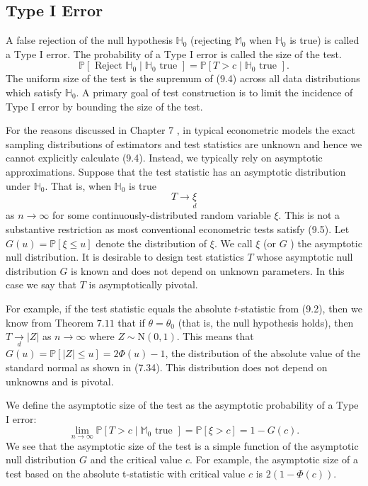 \documentclass[10pt]{article}
\begin{document}
\subsection{Type I Error}
A false rejection of the null hypothesis $\mathbb{H}_{0}$ (rejecting $\mathbb{M}_{0}$ when $\mathbb{H}_{0}$ is true) is called a Type I error. The probability of a Type I error is called the size of the test.
$$
\mathbb{P}\left[\text { Reject } \mathbb{H}_{0} \mid \mathbb{H}_{0} \text { true }\right]=\mathbb{P}\left[T>c \mid \mathbb{H}_{0} \text { true }\right] .
$$
The uniform size of the test is the supremum of (9.4) across all data distributions which satisfy $\mathbb{H}_{0}$. A primary goal of test construction is to limit the incidence of Type I error by bounding the size of the test.

For the reasons discussed in Chapter 7 , in typical econometric models the exact sampling distributions of estimators and test statistics are unknown and hence we cannot explicitly calculate (9.4). Instead, we typically rely on asymptotic approximations. Suppose that the test statistic has an asymptotic distribution under $\mathbb{H}_{0}$. That is, when $\mathbb{H}_{0}$ is true
$$
T \longrightarrow \underset{d}{\xi}
$$
as $n \rightarrow \infty$ for some continuously-distributed random variable $\xi$. This is not a substantive restriction as most conventional econometric tests satisfy (9.5). Let $G(u)=\mathbb{P}[\xi \leq u]$ denote the distribution of $\xi$. We call $\xi$ (or $G$ ) the asymptotic null distribution. It is desirable to design test statistics $T$ whose asymptotic null distribution $G$ is known and does not depend on unknown parameters. In this case we say that $T$ is asymptotically pivotal.

For example, if the test statistic equals the absolute $t$-statistic from (9.2), then we know from Theorem $7.11$ that if $\theta=\theta_{0}$ (that is, the null hypothesis holds), then $T \underset{d}{\rightarrow}|Z|$ as $n \rightarrow \infty$ where $Z \sim \mathrm{N}(0,1)$. This means that $G(u)=\mathbb{P}[|Z| \leq u]=2 \Phi(u)-1$, the distribution of the absolute value of the standard normal as shown in (7.34). This distribution does not depend on unknowns and is pivotal.

We define the asymptotic size of the test as the asymptotic probability of a Type I error:
$$
\lim _{n \rightarrow \infty} \mathbb{P}\left[T>c \mid \mathbb{M}_{0} \text { true }\right]=\mathbb{P}[\xi>c]=1-G(c) .
$$
We see that the asymptotic size of the test is a simple function of the asymptotic null distribution $G$ and the critical value $c$. For example, the asymptotic size of a test based on the absolute t-statistic with critical value $c$ is $2(1-\Phi(c))$.
\end{document}
